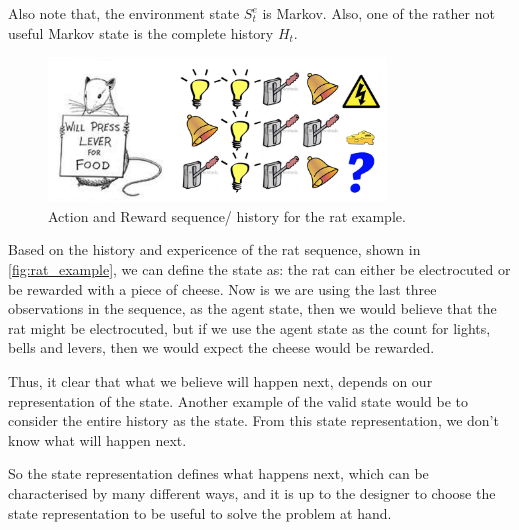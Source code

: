 Also note that, the environment state \(S_t^e\) is Markov. Also, one of the rather not useful Markov
state is the complete history \(H_t\).\\
\begin{example}
\begin{figure}[H]
    \centering
    \includegraphics[width=0.8\textwidth]{figures/rat_example.png}
    \caption{Action and Reward sequence/ history for the rat example.}
    \label{fig:rat_example}
\end{figure}
Based on the history and expericence of the rat sequence, shown 
in \autoref{fig:rat_example}, we can define the state as:
the rat can either be electrocuted or be rewarded with a piece of cheese. Now is
we are using the last three observations in the sequence, as the agent state, 
then we would believe that the rat might be electrocuted, but if we use the
agent state as the count for lights, bells and levers, then we would expect the cheese would be 
rewarded. 

Thus, it clear that what we believe will happen next, depends on our representation of the state.
Another example of the valid state would be to consider the entire history as the state.
From this state representation, we don't know what will happen next.
\end{example}
So the state representation defines what happens next, which can be characterised by many different
ways, and it is up to the designer to choose the state representation to be useful to solve the 
problem at hand.

